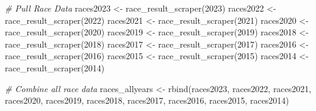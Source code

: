 \documentclass[
]{book}
\newenvironment{Shaded}{\begin{snugshade}}{\end{snugshade}}
\newcommand{\CommentTok}[1]{\textcolor[rgb]{0.56,0.35,0.01}{\textit{#1}}}
\newcommand{\DecValTok}[1]{\textcolor[rgb]{0.00,0.00,0.81}{#1}}
\newcommand{\FunctionTok}[1]{\textcolor[rgb]{0.00,0.00,0.00}{#1}}
\newcommand{\NormalTok}[1]{#1}
\newcommand{\OtherTok}[1]{\textcolor[rgb]{0.56,0.35,0.01}{#1}}
\begin{document}
\begin{Shaded}
\begin{Highlighting}[]
\CommentTok{\# Pull Race Data}
\NormalTok{races2023 }\OtherTok{\textless{}{-}} \FunctionTok{race\_result\_scraper}\NormalTok{(}\DecValTok{2023}\NormalTok{)}
\NormalTok{races2022 }\OtherTok{\textless{}{-}} \FunctionTok{race\_result\_scraper}\NormalTok{(}\DecValTok{2022}\NormalTok{)}
\NormalTok{races2021 }\OtherTok{\textless{}{-}} \FunctionTok{race\_result\_scraper}\NormalTok{(}\DecValTok{2021}\NormalTok{)}
\NormalTok{races2020 }\OtherTok{\textless{}{-}} \FunctionTok{race\_result\_scraper}\NormalTok{(}\DecValTok{2020}\NormalTok{)}
\NormalTok{races2019 }\OtherTok{\textless{}{-}} \FunctionTok{race\_result\_scraper}\NormalTok{(}\DecValTok{2019}\NormalTok{)}
\NormalTok{races2018 }\OtherTok{\textless{}{-}} \FunctionTok{race\_result\_scraper}\NormalTok{(}\DecValTok{2018}\NormalTok{)}
\NormalTok{races2017 }\OtherTok{\textless{}{-}} \FunctionTok{race\_result\_scraper}\NormalTok{(}\DecValTok{2017}\NormalTok{)}
\NormalTok{races2016 }\OtherTok{\textless{}{-}} \FunctionTok{race\_result\_scraper}\NormalTok{(}\DecValTok{2016}\NormalTok{)}
\NormalTok{races2015 }\OtherTok{\textless{}{-}} \FunctionTok{race\_result\_scraper}\NormalTok{(}\DecValTok{2015}\NormalTok{)}
\NormalTok{races2014 }\OtherTok{\textless{}{-}} \FunctionTok{race\_result\_scraper}\NormalTok{(}\DecValTok{2014}\NormalTok{)}

\CommentTok{\# Combine all race data}
\NormalTok{races\_allyears }\OtherTok{\textless{}{-}} \FunctionTok{rbind}\NormalTok{(races2023,}
\NormalTok{                             races2022,}
\NormalTok{                             races2021, }
\NormalTok{                             races2020,}
\NormalTok{                             races2019,}
\NormalTok{                             races2018,}
\NormalTok{                             races2017,}
\NormalTok{                             races2016,}
\NormalTok{                             races2015,}
\NormalTok{                             races2014)}


\end{Highlighting}
\end{Shaded}
\end{document}
